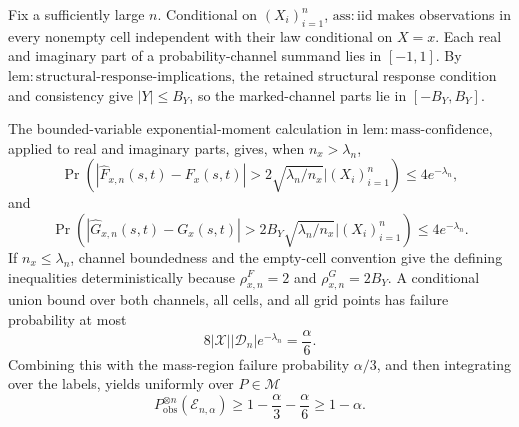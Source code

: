 Fix a sufficiently large \(n\).  Conditional on \((X_i)_{i=1}^n\), \(\mathrm{ass{:}iid}\) makes observations in every nonempty cell independent with their law conditional on \(X=x\).  Each real and imaginary part of a probability-channel summand lies in \([-1,1]\).  By \(\mathrm{lem{:}structural\text{-}response\text{-}implications}\), the retained structural response condition and consistency give \(|Y|\le B_Y\), so the marked-channel parts lie in \([-B_Y,B_Y]\).

The bounded-variable exponential-moment calculation in \(\mathrm{lem{:}mass\text{-}confidence}\), applied to real and imaginary parts, gives, when \(n_x>\lambda_n\),
\[
 \Pr\left(
 |\widehat F_{x,n}(s,t)-F_x(s,t)|>2\sqrt{\lambda_n/n_x}
 \mathrel{\Big|}(X_i)_{i=1}^n\right)\le4e^{-\lambda_n},
\]
and
\[
 \Pr\left(
 |\widehat G_{x,n}(s,t)-G_x(s,t)|>2B_Y\sqrt{\lambda_n/n_x}
 \mathrel{\Big|}(X_i)_{i=1}^n\right)\le4e^{-\lambda_n}.
\]
If \(n_x\le\lambda_n\), channel boundedness and the empty-cell convention give the defining inequalities deterministically because \(\rho^F_{x,n}=2\) and \(\rho^G_{x,n}=2B_Y\).  A conditional union bound over both channels, all cells, and all grid points has failure probability at most
\[
 8|\mathcal X||\mathcal D_n|e^{-\lambda_n}=\frac{\alpha}{6}.
\]
Combining this with the mass-region failure probability \(\alpha/3\), and then integrating over the labels, yields uniformly over \(P\in\mathcal M\)
\[
 P_{\mathrm{obs}}^{\otimes n}(\mathcal E_{n,\alpha})
 \ge1-\frac\alpha3-\frac\alpha6\ge1-\alpha.
\]

